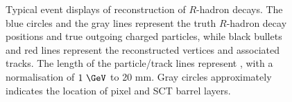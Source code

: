 \documentclass[NOTE, atlasdraft=true, texlive=2018, UKenglish]{\ATLASLATEXPATH atlasdoc}
\begin{document}
\begin{figure}[h]
\begin{center}
\caption{Typical event displays of reconstruction of $R$-hadron decays. The blue circles and the gray lines represent the truth $R$-hadron decay positions and true outgoing charged particles, while black bullets and red lines represent the reconstructed vertices and associated tracks. The length of the particle/track lines represent \pt, with a normalisation of $1~\GeV$ to 20 mm. Gray circles approximately indicates the location of pixel and SCT barrel layers.}
\label{fig:eventDisplays}
\end{center}
\end{figure}
\end{document}
